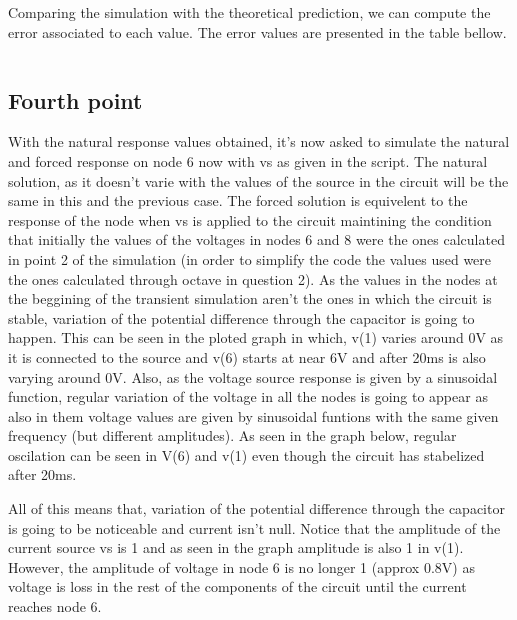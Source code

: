 \par Comparing the simulation with the theoretical prediction, we can compute the error associated to each value. The error values are presented in the table bellow.

\vspace{5mm}
\begin{table}[h!]
\centering
\begin{tabularx}{0.6\textwidth} {
  | >{\raggedright\arraybackslash}X
  | >{\raggedleft\arraybackslash}X | }
 \hline

\end{tabularx}
\end{table}
\vspace{5mm}
\newpage


\subsection{Fourth point}
\label{ssec:4S}

\par With the natural response values obtained, it's now asked to simulate the natural and forced response on node 6 now with vs as given in the script. The natural solution, as it doesn't varie with the values of the source in the circuit will be the same in this and the previous case. The forced solution is equivelent to the response of the node when vs is applied to the circuit maintining the condition that initially the values of the voltages in nodes 6 and 8 were the ones calculated in point 2 of the simulation (in order to simplify the code the values used were the ones calculated through octave in question 2). As the values in the nodes at the beggining of the transient simulation aren't the ones in which the circuit is stable, variation of the potential difference through the capacitor is going to happen. This can be seen in the ploted graph in which, v(1) varies around 0V as it is connected to the source and v(6) starts at near 6V and after 20ms is also varying around 0V. Also, as the voltage source response is given by a sinusoidal function, regular variation of the voltage in all the nodes is going to appear as also in them voltage values are given by sinusoidal funtions with the same given frequency (but different amplitudes). As seen in the graph below, regular oscilation can be seen in V(6) and v(1) even though the circuit has stabelized after 20ms.
\par All of this means that, variation of the potential difference through the capacitor is going to be noticeable and current isn't null. Notice that the amplitude of the current source vs is 1 and as seen in the graph amplitude is also 1 in v(1). However, the amplitude of voltage in node 6 is no longer 1 (approx 0.8V) as voltage is loss in the rest of the components of the circuit until the current reaches node 6. 

